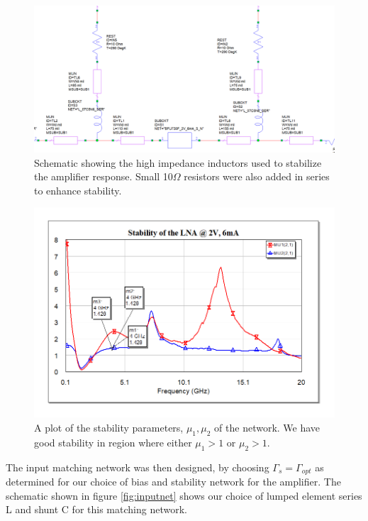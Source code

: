 \documentclass[twocolumn, aps, floatfix]{revtex4-1}
\begin{document}
    \begin{figure}[!htbp]
        \centering
        \includegraphics[scale=0.35]{LNA_net.png}
        \caption{Schematic showing the high impedance inductors used to stabilize the amplifier response. Small 10$\Omega$ resistors were also added in series to enhance stability.}
        \label{fig:LNAnet}
    \end{figure}

    \begin{figure}[!htbp]
    \centering
    \includegraphics[scale=0.40]{stability.png}
    \caption{A plot of the stability parameters, $\mu_1, \mu_2$ of the network. We have good stability in region where either $\mu_1 > 1$ or $\mu_2 > 1$. }
    \label{fig:stability}
    \end{figure}

The input matching network was then designed, by choosing $\Gamma_s = \Gamma_{opt}$ as determined for our choice of bias and stability network for the amplifier. The schematic shown in figure \ref{fig:inputnet} shows our choice of lumped element series L and shunt C for this matching network.
\end{document}
